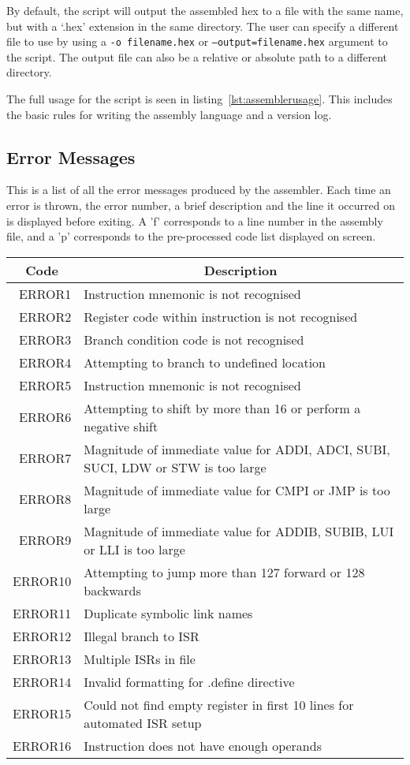 By default, the script will output the assembled hex to a file with the same name, but with a `.hex' extension in the same directory.
The user can specify a different file to use by using a \texttt{-o filename.hex} or \texttt{--output=filename.hex} argument to the script.
The output file can also be a relative or absolute path to a different directory. 

The full usage for the script is seen in listing~\ref{lst:assemblerusage}. 
This includes the basic rules for writing the assembly language and a version log. 



\newpage
\subsection{Error Messages}
This is a list of all the error messages produced by the assembler. Each time an error is thrown, the error number, a brief description and the line it occurred on is displayed before exiting. A 'f' corresponds to a line number in the assembly file, and a 'p' corresponds to the pre-processed code list displayed on screen. 

\begin{center}
	\centering
	\begin{tabular}{r|p{12cm}}
		\multicolumn{1}{c}{\bf Code} & \multicolumn{1}{c}{\bf Description} \\
		\hline\hline
		ERROR1& Instruction mnemonic is not recognised \\
		ERROR2& Register code within instruction is not recognised\\
		ERROR3& Branch condition code is not recognised\\
		ERROR4& Attempting to branch to undefined location \\
		ERROR5& Instruction mnemonic is not recognised \\
		ERROR6& Attempting to shift by more than 16 or perform a negative shift \\
		ERROR7& Magnitude of immediate value for ADDI, ADCI, SUBI, SUCI, LDW or STW is too large\\
		ERROR8& Magnitude of immediate value for CMPI or JMP is too large \\
		ERROR9& Magnitude of immediate value for ADDIB, SUBIB, LUI or LLI is too large \\
		ERROR10& Attempting to jump more than 127 forward or 128 backwards \\
		ERROR11& Duplicate symbolic link names \\
		ERROR12& Illegal branch to ISR \\
		ERROR13& Multiple ISRs in file \\
		ERROR14& Invalid formatting for .define directive \\
		ERROR15& Could not find empty register in first 10 lines for automated ISR setup \\
		ERROR16& Instruction does not have enough operands \\
	\end{tabular}
\end{center}
